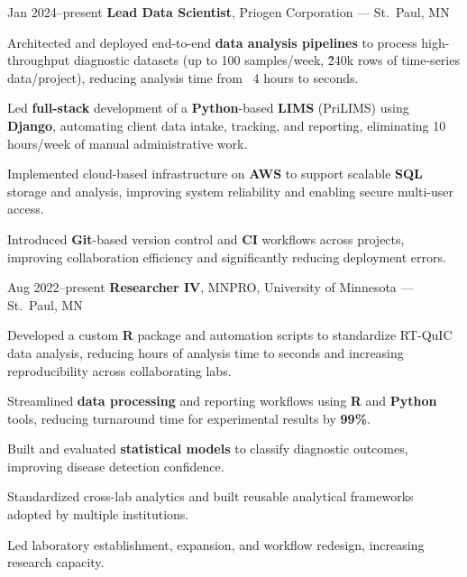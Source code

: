 \documentclass{resume}
\begin{document}
        \begin{twocolentry}{Jan 2024--present}
            \textbf{Lead Data Scientist}, Priogen Corporation --- St.\ Paul, MN
        \end{twocolentry}
        \begin{onecolentry}
            \begin{highlights}
                \item Architected and deployed end-to-end \textbf{data analysis pipelines} to process high-throughput diagnostic datasets (up to 100 samples/week, \~240k rows of time-series data/project), reducing analysis time from ~4 hours to seconds.
                \item Led \textbf{full-stack} development of a \textbf{Python}-based \textbf{LIMS} (PriLIMS) using \textbf{Django}, automating client data intake, tracking, and reporting, eliminating 10 hours/week of manual administrative work.
                \item Implemented cloud-based infrastructure on \textbf{AWS} to support scalable \textbf{SQL} storage and analysis, improving system reliability and enabling secure multi-user access.
                \item Introduced \textbf{Git}-based version control and \textbf{CI} workflows across projects, improving collaboration efficiency and significantly reducing deployment errors.
            \end{highlights}
        \end{onecolentry}

        \begin{twocolentry}{Aug 2022--present}
            \textbf{Researcher IV}, MNPRO, University of Minnesota --- St.\ Paul, MN
        \end{twocolentry}
        \begin{onecolentry}
            \begin{highlights}
                \item Developed a custom \textbf{R} package and automation scripts to standardize RT-QuIC data analysis, reducing hours of analysis time to seconds and increasing reproducibility across collaborating labs.
                \item Streamlined \textbf{data processing} and reporting workflows using \textbf{R} and \textbf{Python} tools, reducing turnaround time for experimental results by \textbf{99\%}.
                \item Built and evaluated \textbf{statistical models} to classify diagnostic outcomes, improving disease detection confidence.
                \item Standardized cross-lab analytics and built reusable analytical frameworks adopted by multiple institutions.
                \item Led laboratory establishment, expansion, and workflow redesign, increasing research capacity.
            \end{highlights}
        \end{onecolentry}
\end{document}
